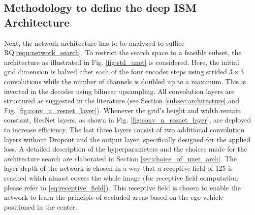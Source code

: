 \subsection{Methodology to define the deep ISM Architecture}
\label{subsec:method_deep_ism_architecture}
Next, the network architecture has to be analyzed to suffice RQ\ref{requ:network_search}. To restrict the search space to a feasible subset, the architecture as illustrated in Fig. \ref{fig:std_unet} is considered. Here, the initial grid dimension is halved after each of the four encoder steps using strided $3\times 3$ convolutions while the number of channels is doubled up to a maximum. This is inverted in the decoder using bilinear upsampling. All convolution layers are structured as suggested in the literature (see Section \ref{subsec:architecture} and Fig. \ref{fig:conv_n_resnet_layer}). Whenever the grid's height and width remain constant, ResNet layers, as shown in Fig. \ref{fig:conv_n_resnet_layer}, are deployed to increase efficiency. The last three layers consist of two additional convolution layers without Dropout and the output layer, specifically designed for the applied loss. A detailed description of the hyperparameters and the choices made for the architecture search are elaborated in Section \ref{sec:choice_of_unet_arch}. The layer depth of the network is chosen in a way that a receptive field of 125 is reached which almost covers the whole image (for receptive field computation please refer to \eqref{eq:receptive_field}). This receptive field is chosen to enable the network to learn the principle of occluded areas based on the ego vehicle positioned in the center. 
